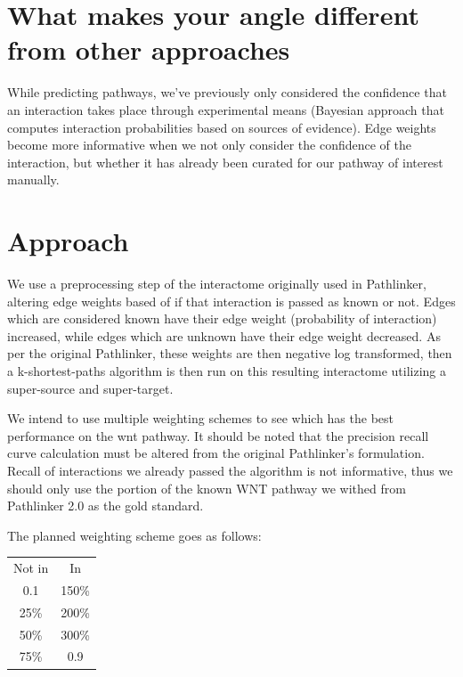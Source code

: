 \documentclass[10pt,letterpaper,twocolumn,twoside]{article}
\begin{document}

\section{What makes your angle different from other approaches}

While predicting pathways, we've previously only considered the
confidence that an interaction takes place through experimental means
(Bayesian approach that computes interaction probabilities based on
sources of evidence).  Edge weights become more informative when we
not only consider the confidence of the interaction, but whether it
has already been curated for our pathway of interest manually.

\section{Approach}

We use a preprocessing step of the interactome originally used in
Pathlinker, altering edge weights based of if that interaction is
passed as known or not.  Edges which are considered known have their
edge weight (probability of interaction) increased, while edges which
are unknown have their edge weight decreased.  As per the original
Pathlinker, these weights are then negative log transformed, then a
k-shortest-paths algorithm is then run on this resulting interactome
utilizing a super-source and super-target.

We intend to use multiple weighting schemes to see which has the best
performance on the wnt pathway.  It should be noted that the precision
recall curve calculation must be altered from the original
Pathlinker's formulation.  Recall of interactions we already passed
the algorithm is not informative, thus we should only use the portion
of the known WNT pathway we withed from Pathlinker 2.0 as the gold
standard.

The planned weighting scheme goes as follows:

\begin{tabular}{cc}
	Not in & In \\ 
	0.1 & 150\% \\ 
	25\% & 200\% \\ 
	50\% & 300\% \\ 
	75\% & 0.9
\end{tabular} 
\end{document}
